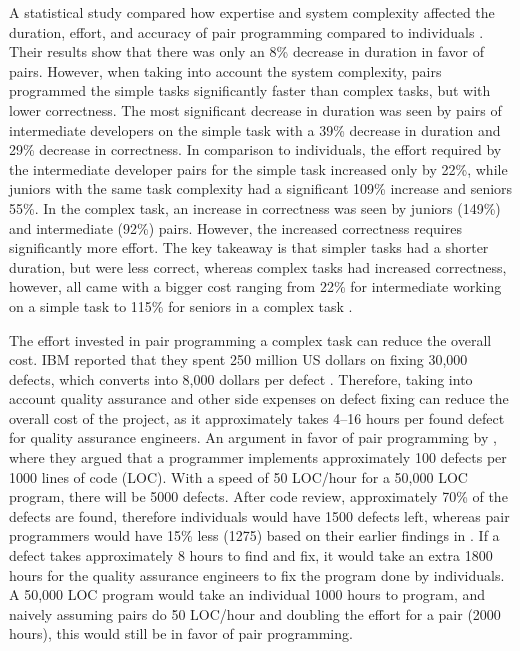 \documentclass[conference]{IEEEtran}
\begin{document}
A statistical study compared how expertise and system complexity affected the duration, effort, and accuracy of pair programming compared to individuals \cite{Arisholm2007Evaluating}. Their results show that there was only an 8\% decrease in duration in favor of pairs. However, when taking into account the system complexity, pairs programmed the simple tasks significantly faster than complex tasks, but with lower correctness. The most significant decrease in duration was seen by pairs of intermediate developers on the simple task with a 39\% decrease in duration and 29\% decrease in correctness. In comparison to individuals, the effort required by the intermediate developer pairs for the simple task increased only by 22\%, while juniors with the same task complexity had a significant 109\% increase and seniors 55\%. In the complex task, an increase in correctness was seen by juniors (149\%) and intermediate (92\%) pairs. However, the increased correctness requires significantly more effort. The key takeaway is that simpler tasks had a shorter duration, but were less correct, whereas complex tasks had increased correctness, however, all came with a bigger cost ranging from 22\% for intermediate working on a simple task to 115\% for seniors in a complex task \cite{Arisholm2007Evaluating}.

The effort invested in pair programming a complex task can reduce the overall cost. IBM reported that they spent 250 million US dollars on fixing 30,000 defects, which converts into 8,000 dollars per defect \cite{10.5555/377517.377531}. Therefore, taking into account quality assurance and other side expenses on defect fixing can reduce the overall cost of the project, as it approximately takes 4--16 hours per found defect for quality assurance engineers. An argument in favor of pair programming by \cite{10.5555/377517.377531}, where they argued that a programmer implements approximately 100 defects per 1000 lines of code (LOC). With a speed of 50 LOC/hour for a 50,000 LOC program, there will be 5000 defects. After code review, approximately 70\% of the defects are found, therefore individuals would have 1500 defects left, whereas pair programmers would have 15\% less (1275) based on their earlier findings in \cite{Williams2000Strengthening}. If a defect takes approximately 8 hours to find and fix, it would take an extra 1800 hours for the quality assurance engineers to fix the program done by individuals. A 50,000 LOC program would take an individual 1000 hours to program, and naively assuming pairs do 50 LOC/hour and doubling the effort for a pair (2000 hours), this would still be in favor of pair programming. 
\end{document}
